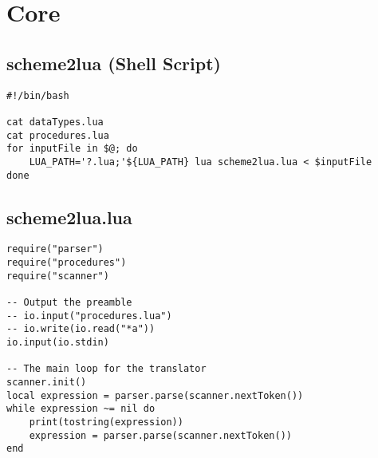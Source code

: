 \section{Core}
\subsection{scheme2lua (Shell Script)}
\begin{verbatim}
#!/bin/bash

cat dataTypes.lua
cat procedures.lua
for inputFile in $@; do
    LUA_PATH='?.lua;'${LUA_PATH} lua scheme2lua.lua < $inputFile
done
\end{verbatim}

\subsection{scheme2lua.lua}
\begin{verbatim}
require("parser")
require("procedures")
require("scanner")

-- Output the preamble
-- io.input("procedures.lua")
-- io.write(io.read("*a"))
io.input(io.stdin)

-- The main loop for the translator
scanner.init()
local expression = parser.parse(scanner.nextToken())
while expression ~= nil do
    print(tostring(expression))
    expression = parser.parse(scanner.nextToken())
end
\end{verbatim}

